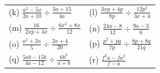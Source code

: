 \begin{enumerate}[noitemsep, label=\textbf{\arabic*}. ]
{\begin{tabular}[t]{|l|l|}
        (k) $\frac{{a}^{2}-5a}{2a+10}÷\frac{3a+15}{4a}$\hspace{1ex} &
        (l) $\frac{3xp+4p}{8p}÷\frac{12{p}^{2}}{3x+4}$\hspace{1ex}%
     \tabularnewline\cline{1-1}\cline{2-2}
        (m) $\frac{16}{2xp+4x}÷\frac{6{x}^{2}+8x}{12}$\hspace{1ex} &
        (n) $\frac{24a-8}{12}÷\frac{9a-3}{6}$\hspace{1ex}%
     \tabularnewline\cline{1-1}\cline{2-2}
        (o) $\frac{{a}^{2}+2a}{5}÷\frac{2a+4}{20}$\hspace{1ex} &
        (p) $\frac{{p}^{2}+pq}{7p}÷\frac{8p+8q}{21q}$\hspace{1ex}%
     \tabularnewline\cline{1-1}\cline{2-2}
        (q) $\frac{5ab-15b}{4a-12}÷\frac{6{b}^{2}}{a+b}$\hspace{1ex} &
        (r) $\frac{{f}^{2}a-f{a}^{2}}{f-a}$%
     \tabularnewline\cline{1-1}\cline{2-2}

\end{tabular}}
\end{enumerate}
